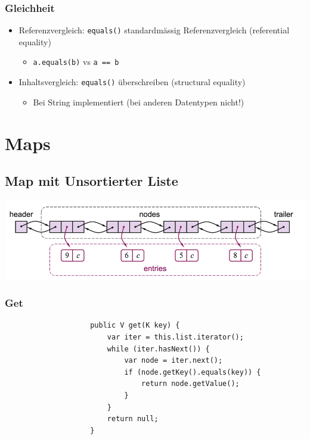 \documentclass[a4paper, landscape, 8pt]{scrartcl}
\begin{document}
\begin{multicols*}{4}
                \subsubsection{Gleichheit}
                    \begin{itemize}
                        \item Referenzvergleich: \texttt{equals()} standardmässig Referenzvergleich
                        (referential equality)
                        \begin{itemize}
                            \item \texttt{a.equals(b)} vs \texttt{a == b}
                        \end{itemize}
                        \item Inhaltsvergleich: \texttt{equals()} überschreiben (structural equality)
                        \begin{itemize}
                            \item Bei String implementiert (bei anderen Datentypen nicht!)
                        \end{itemize}
                    \end{itemize}

        \section{Maps}
            \subsection{Map mit Unsortierter Liste}
                \includegraphics[scale=0.16]{graphic/18_map_mit_unsortierter_liste}

                \subsubsection{Get}
                    \begin{lstlisting}
                    public V get(K key) {
                        var iter = this.list.iterator();
                        while (iter.hasNext()) {
                            var node = iter.next();
                            if (node.getKey().equals(key)) {
                                return node.getValue();
                            }
                        }
                        return null;
                    }
                    \end{lstlisting}
                

\end{multicols*}
\end{document}
